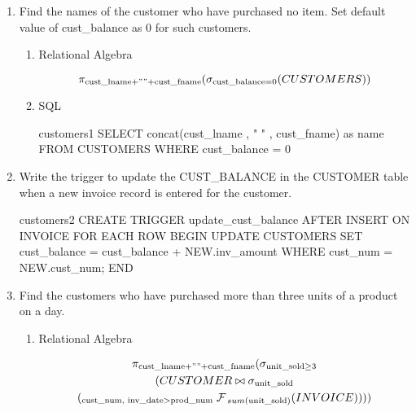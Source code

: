 \begin{enumerate}
    \item Find the names of the customer who have purchased no item. Set default value of cust\_balance as 0 for
          such customers.

          \begin{enumerate}
              \item Relational Algebra

                    \begin{equation*}
                        \pi_{\text{cust\_lname} + " " + \text{cust\_fname}}(\sigma_{\text{cust\_balance} = 0} (CUSTOMERS))
                    \end{equation*}

              \item SQL

                    \begin{sqlQuery}{customers1}
                        SELECT concat(cust_lname , " " , cust_fname) as name
                        FROM CUSTOMERS
                        WHERE cust_balance = 0
                    \end{sqlQuery}

          \end{enumerate}

    \item Write the trigger to update the \textsc{CUST\_BALANCE} in the CUSTOMER table when a new invoice record
          is entered for the customer.


          \begin{sqlQuery}{customers2}
                CREATE TRIGGER update_cust_balance
                AFTER INSERT ON INVOICE
                FOR EACH ROW
                BEGIN
                    UPDATE CUSTOMERS
                    SET cust_balance = cust_balance + NEW.inv_amount
                    WHERE cust_num = NEW.cust_num;
                END
        \end{sqlQuery}


    \item Find the customers who have purchased more than three units of a product on a day.

          \begin{enumerate}
              \item Relational Algebra

                    \begin{multline*}
                        \pi_{\text{cust\_lname} + " " + \text{cust\_fname}} (\sigma_{\text{unit\_sold} \geq  3} \\
                        (CUSTOMER \bowtie \sigma_{\text{unit\_sold}}\\
                        ({}_{\text{cust\_num, inv\_date} > \text{prod\_num}} \; \mathcal{F}_{\; sum(\text{unit\_sold})} (INVOICE))))
                    \end{multline*}


\end{enumerate}
\end{enumerate}
